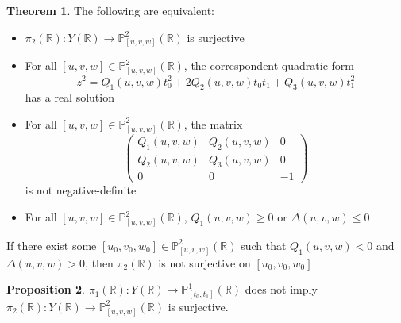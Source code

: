 \documentclass{article}
\newcommand{\Rbb}{\mathbb{R}}
\newcommand{\Pbb}{\mathbb{P}}
\begin{document}
\theoremstyle{definition}
\newtheorem{theorem}{Theorem}[section]
\theoremstyle{definition}
\newtheorem{conjecture}[theorem]{Conjecture}
\theoremstyle{definition}
\newtheorem{definition}[theorem]{Definition}
\theoremstyle{definition}
\newtheorem{goal}[theorem]{Goal}
\theoremstyle{definition}
\newtheorem{corollary}[theorem]{Corollary}
\theoremstyle{definition}
\newtheorem{question}[theorem]{Question}
\theoremstyle{definition}
\newtheorem{lemma}[theorem]{Lemma}
\theoremstyle{definition}
\newtheorem{proposition}[theorem]{Proposition}

\begin{theorem}
The following are equivalent:
\begin{itemize}
    \item $\pi_2(\Rbb): Y(\Rbb) \to \Pbb^{2}_{[u, v, w]}(\Rbb)$ is surjective
    \item For all $[u, v, w] \in \Pbb^2_{[u, v, w]}(\Rbb)$, the correspondent quadratic form
    \[z^2 = Q_1(u, v, w)t_0^2 + 2Q_2(u, v, w)t_0 t_1 + Q_3(u, v, w) t_1^2\]
    has a real solution
    \item For all $[u, v, w] \in \Pbb^2_{[u, v, w]}(\Rbb)$, the matrix
    \[\begin{pmatrix}
    Q_1(u, v, w) & Q_2(u, v, w) & 0\\ 
    Q_2(u, v, w) & Q_3(u, v, w) & 0\\
    0 & 0 & -1
    \end{pmatrix}\]
    is not negative-definite
    \item For all $[u, v, w] \in \Pbb^2_{[u, v, w]}(\Rbb)$, $Q_1(u, v, w) \geq 0$ or $\Delta(u, v, w) \leq 0$
\end{itemize}
If there exist some $[u_0, v_0, w_0] \in \Pbb^2_{[u, v, w]}(\Rbb)$ such that $Q_1(u, v, w) < 0$ and $\Delta(u, v, w) > 0$, then $\pi_2(\Rbb)$ is not surjective on $[u_0, v_0, w_0]$ 
\end{theorem}

\begin{proposition}
$\pi_1(\Rbb): Y(\Rbb) \to \Pbb^{1}_{[t_0, t_1]}(\Rbb)$ does not imply $\pi_2(\Rbb): Y(\Rbb) \to \Pbb^{2}_{[u, v, w]}(\Rbb)$ is surjective.
\end{proposition}
\end{document}
